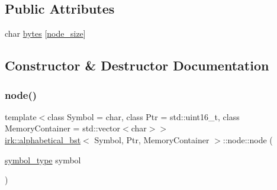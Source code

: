 \subsection*{Public Attributes}
\begin{DoxyCompactItemize}
\item 
char \mbox{\hyperlink{structirk_1_1alphabetical__bst_1_1node_a7265f1f590ce88be2460facd16c08611}{bytes}} \mbox{[}\mbox{\hyperlink{classirk_1_1alphabetical__bst_a6f7d3f7002730eb7840e449d4d371235}{node\+\_\+size}}\mbox{]}
\end{DoxyCompactItemize}


\subsection{Constructor \& Destructor Documentation}
\mbox{\label{structirk_1_1alphabetical__bst_1_1node_a5b892f196ffd2c8c732b7a230097dd42}} 
\subsubsection{\texorpdfstring{node()}{node()}\hspace{0.1cm}{\footnotesize\ttfamily [1/2]}}
{\footnotesize\ttfamily template$<$class Symbol = char, class Ptr = std\+::uint16\+\_\+t, class Memory\+Container = std\+::vector$<$char$>$$>$ \\
\mbox{\hyperlink{classirk_1_1alphabetical__bst}{irk\+::alphabetical\+\_\+bst}}$<$ Symbol, Ptr, Memory\+Container $>$\+::node\+::node (\begin{DoxyParamCaption}\item[{\mbox{\hyperlink{classirk_1_1alphabetical__bst_a296ccb8fa9fa9dce3b3c3beab0a5ca28}{symbol\+\_\+type}}}]{symbol }\end{DoxyParamCaption})\hspace{0.3cm}{\ttfamily [inline]}}

\mbox{\label{structirk_1_1alphabetical__bst_1_1node_add6fee4d8429568f4caa72a221279470}} 
